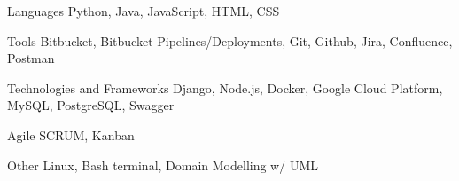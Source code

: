 

\begin{cvskills}

  \cvskill
    {Languages} %
    {Python, Java, JavaScript, HTML, CSS} %

  \cvskill
    {Tools} %
    {Bitbucket, Bitbucket Pipelines/Deployments, Git, Github, Jira, Confluence, Postman} %
    
  \cvskill
    {Technologies and Frameworks} %
    {Django, Node.js, Docker, Google Cloud Platform, MySQL, PostgreSQL, Swagger} %
    
  \cvskill
    {Agile} %
    {SCRUM, Kanban} %

  \cvskill
    {Other} %
    {Linux, Bash terminal, Domain Modelling w/ UML} %

\end{cvskills}